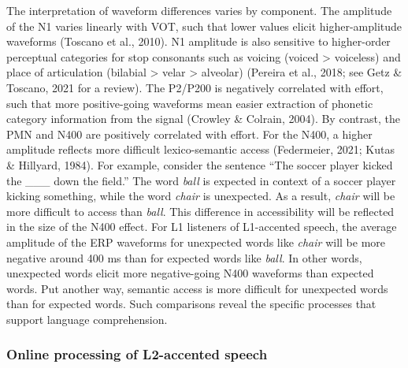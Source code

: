 \documentclass[
  12pt,
  twoside]{article}
\begin{document}
The interpretation of waveform differences varies by component.
The amplitude of the N1 varies linearly with VOT, such that lower values elicit higher-amplitude waveforms (Toscano et al., 2010).
N1 amplitude is also sensitive to higher-order perceptual categories for stop consonants such as voicing (voiced \textgreater{} voiceless) and place of articulation (bilabial \textgreater{} velar \textgreater{} alveolar) (Pereira et al., 2018; see Getz \& Toscano, 2021 for a review).
The P2/P200 is negatively correlated with effort, such that more positive-going waveforms mean easier extraction of phonetic category information from the signal (Crowley \& Colrain, 2004).
By contrast, the PMN and N400 are positively correlated with effort.
For the N400, a higher amplitude reflects more difficult lexico-semantic access (Federmeier, 2021; Kutas \& Hillyard, 1984).
For example, consider the sentence ``The soccer player kicked the \_\_\_ down the field.''
The word \emph{ball} is expected in context of a soccer player kicking something, while the word \emph{chair} is unexpected.
As a result, \emph{chair} will be more difficult to access than \emph{ball}.
This difference in accessibility will be reflected in the size of the N400 effect.
For L1 listeners of L1-accented speech, the average amplitude of the ERP waveforms for unexpected words like \emph{chair} will be more negative around 400 ms than for expected words like \emph{ball}.
In other words, unexpected words elicit more negative-going N400 waveforms than expected words.
Put another way, semantic access is more difficult for unexpected words than for expected words.
Such comparisons reveal the specific processes that support language comprehension.

\hypertarget{online-processing-of-l2-accented-speech}{%
\subsubsection{Online processing of L2-accented speech}\label{online-processing-of-l2-accented-speech}}
\end{document}
